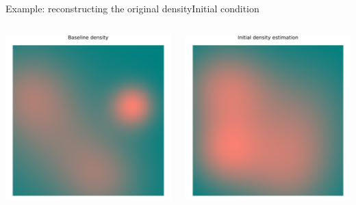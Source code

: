 \documentclass[aspectratio=169]{beamer}
\begin{document}
\begin{frame}{Example: reconstructing the original density}{Initial condition}


	\begin{columns}
		
		\begin{column}{0.5\textwidth}
			\includegraphics[width=\columnwidth]{figuras/baseline_density.pdf}
		\end{column}
		\begin{column}{0.5\textwidth}
			\includegraphics[width=\columnwidth]{figuras/initial_condition.pdf}			
		\end{column}

	\end{columns}

\end{frame}
\end{document}
